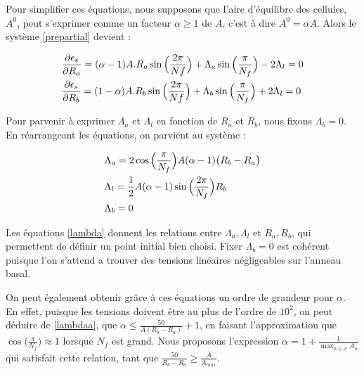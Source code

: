 \documentclass[11pt,a4paper]{article}
\begin{document}
Pour simplifier ces équations, nous supposons que l'aire d'équilibre des cellules, $A^0$, peut s'exprimer comme un facteur $\alpha \ge 1$ de $A$, c'est à dire $A^0=\alpha A$. Alors le système \eqref{prepartial} devient :

\begin{subequations}{\label{partial}}
    \begin{align}
            &\frac{\partial \epsilon_s}{\partial R_a} = (\alpha-1)A.R_a\sin\Big(\frac{2\pi}{Nf}\Big)+\Lambda_a
            \sin\Big(\frac{\pi}{N_f}\Big)-2\Lambda_l = 0\label{partialA}\\
            &\frac{\partial \epsilon_s}{\partial R_b} = (1-\alpha)A.R_b\sin\Big(\frac{2\pi}{Nf}\Big)+\Lambda_b \sin\Big(\frac{\pi}{N_f}\Big)+2\Lambda_l = 0\label{partialB}
    \end{align}
\end{subequations}

Pour parvenir à exprimer $\Lambda_a$ et $\Lambda_l$ en fonction de $R_a$ et $R_b$, nous fixons $\Lambda_b = 0$. En réarrangeant les équations, on parvient au système :

\begin{subequations}{\label{lambda}}
    \begin{align}
            &\Lambda_a = 2\cos\Big(\frac{\pi}{N_f}\Big)A(\alpha-1)\big(R_b-R_a\big)\label{lambdaa}\\
            &\Lambda_l = \frac{1}{2}A(\alpha-1)\sin\Big(\frac{2\pi}{N_f}\Big)R_b\label{lambdal}\\
            &\Lambda_b = 0\label{lambdab}
    \end{align}
\end{subequations}

Les équations \eqref{lambda} donnent les relations entre $\Lambda_a, \Lambda_l$ et $R_a, R_b$, qui permettent de définir un point initial bien choisi. Fixer $\Lambda_b = 0$ est cohérent puisque l'on s'attend a trouver des tensions linéaires négligeables sur l'anneau basal.

On peut également obtenir grâce à ces équations un ordre de grandeur pour $\alpha$. En effet, puisque les tensions doivent être au plus de l'ordre de $10^2$, on peut déduire de \eqref{lambdaa}, que $\alpha \le \frac{50}{A(R_b-R_a)}+1$, en faisant l'approximation que $ \cos\Big(\frac{\pi}{N_f}\Big) \approx 1$ lorsque $N_f$ est grand. Nous proposons l'expression $\alpha = 1 + \frac{1}{\max_{\alpha \in \mathcal{A}}A_\alpha}$ qui satisfait cette relation, tant que $\frac{50}{R_b-R_a}\ge \frac{\overline{A}}{A_{max}}$.
\end{document}
